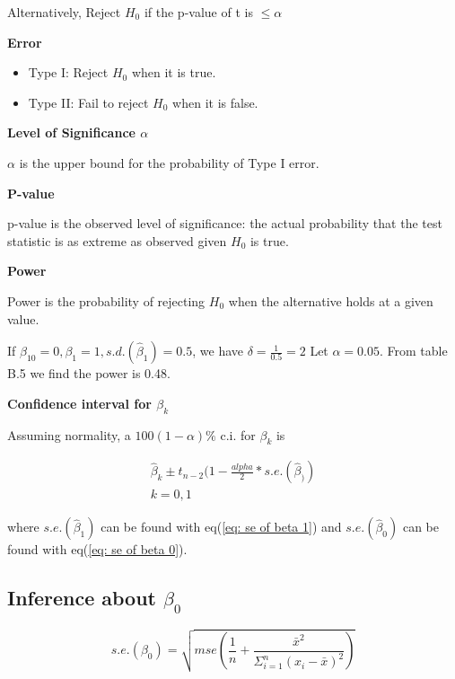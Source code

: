 \documentclass[10pt]{article}
\newcommand{\hlDef}[1]{\colorbox{Thistle2}{#1}}
\begin{document}
\begin{multicols}{3}
    Alternatively, Reject $H_0$ if the p-value of t is $\leq \alpha$

    \textbf{Error}

    \begin{itemize}
        \item \hlDef{Type I}: Reject $H_0$ when it is true.
        \item \hlDef{Type II}: Fail to reject $H_0$ when it is false.
    \end{itemize}

    \textbf{Level of Significance $\alpha$}

    \hlDef{$\alpha$} is the upper bound for the probability of Type I error.

    \textbf{P-value}

    \hlDef{p-value} is the observed level of significance: the actual probability that the test statistic is as extreme as observed given $H_0$ is true.

    \textbf{Power}

    \hlDef{Power} is the probability of rejecting $H_0$ when the alternative holds at a given value.

    If $\beta_{10} = 0, \beta_1 = 1, s.d.(\hat\beta_1) = 0.5$, we have $\delta = \frac{1}{0.5} = 2$ Let $\alpha= 0.05$. From table B.5 we find the power is 0.48.

    \textbf{Confidence interval for $\beta_k$}

    Assuming normality, a $100(1-\alpha)\%$ c.i. for $\beta_k$ is

    \begin{align}\label{eq: CI for beta k}
        \hat\beta_k \pm t_{n-2} (1 - \frac{alpha}{2} * s.e.(\hat\beta_)) \\
        k = 0,1
    \end{align}

    where $s.e.(\hat\beta_1)$ can be found with eq(\ref{eq: se of beta 1}) and $s.e.(\hat\beta_0)$ can be found with eq(\ref{eq: se of beta 0}).



    \subsection[Inference about beta 0]{Inference about $\beta_0$}

    \begin{equation}\label{eq: se of beta 0}
        s.e.(\beta_0) = \sqrt{mse( \frac{1}{n} + \frac{\bar x^2}{\Sigma_{i=1}^n (x_i - \bar x)^2} )}
    \end{equation}


\end{multicols}
\end{document}
